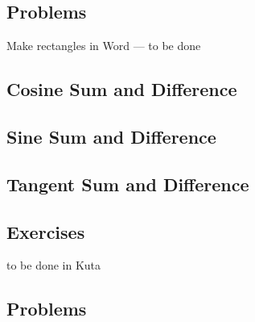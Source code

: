 \newpage
{}
\subsection{Problems}
Make rectangles in Word --- to be done
\subsection{Cosine Sum and Difference}
\subsection{Sine Sum and Difference}
\subsection{Tangent Sum and Difference}
\newpage
\subsection{Exercises}
to be done in Kuta


{}
\subsection{Problems}
\noindent{}
